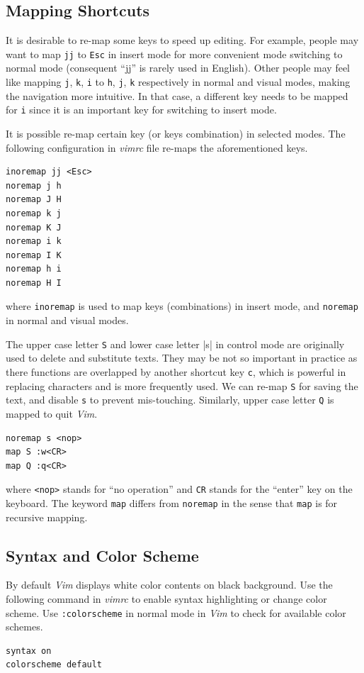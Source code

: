 \subsection{Mapping Shortcuts}

It is desirable to re-map some keys to speed up editing. For example, people may want to map \verb|jj| to \verb|Esc| in insert mode for more convenient mode switching to normal mode (consequent ``jj'' is rarely used in English). Other people may feel like mapping \verb|j|, \verb|k|, \verb|i| to \verb|h|, \verb|j|, \verb|k| respectively in normal and visual modes, making the navigation more intuitive. In that case, a different key needs to be mapped for \verb|i| since it is an important key for switching to insert mode.

It is possible re-map certain key (or keys combination) in selected modes. The following configuration in \textit{vimrc} file re-maps the aforementioned keys.
\begin{verbatim}
inoremap jj <Esc>
noremap j h
noremap J H
noremap k j
noremap K J
noremap i k
noremap I K
noremap h i
noremap H I
\end{verbatim}
where \verb|inoremap| is used to map keys (combinations) in insert mode, and \verb|noremap| in normal and visual modes.

The upper case letter \verb|S| and lower case letter |s| in control mode are originally used to delete and substitute texts. They may be not so important in practice as there functions are overlapped by another shortcut key \verb|c|, which is powerful in replacing characters and is more frequently used. We can re-map \verb|S| for saving the text, and disable \verb|s| to prevent mis-touching. Similarly, upper case letter \verb|Q| is mapped to quit \textit{Vim}.
\begin{verbatim}
noremap s <nop>
map S :w<CR>
map Q :q<CR>
\end{verbatim}
where \verb|<nop>| stands for ``no operation'' and \verb|CR| stands for the ``enter'' key on the keyboard. The keyword \verb|map| differs from \verb|noremap| in the sense that \verb|map| is for recursive mapping.

\subsection{Syntax and Color Scheme}

By default \textit{Vim} displays white color contents on black background. Use the following command in \textit{vimrc} to enable syntax highlighting or change color scheme. Use \verb|:colorscheme| in normal mode in \textit{Vim} to check for available color schemes.
\begin{verbatim}
syntax on
colorscheme default
\end{verbatim}

